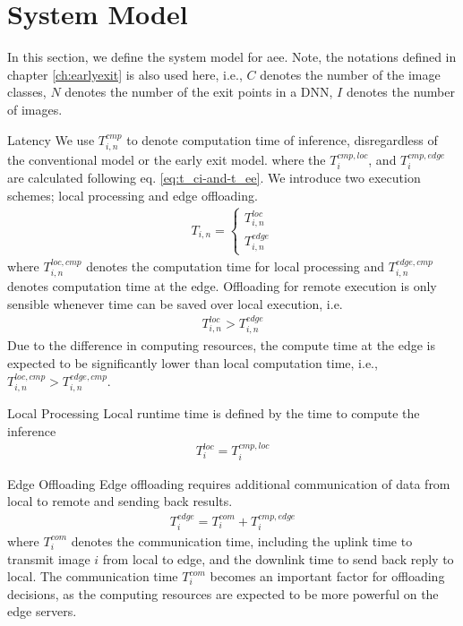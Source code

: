 \section{System Model} \label{sec:edge-system-model}
In this section, we define the system model for \gls{aee}. Note, the notations defined in chapter \ref{ch:earlyexit} is also used here, i.e., $ C $ denotes the number of the image classes, $ N $ denotes the number of the exit points in a DNN, $ I $ denotes the number of images. 	
\begin{enumdescript}
	\item[Latency]  We use $ T_{i,n}^{cmp} $ to denote computation time of inference, disregardless of the conventional model or the early exit model. 
	where the $ T_i^{cmp,loc} $, and $ T_i^{cmp,edge} $ are calculated following eq. \ref{eq:t_ci-and-t_ee}.
	We introduce two execution schemes; local processing and edge offloading.
	\begin{align}
	T_{i,n} = \begin{cases}
	T_{i,n}^{loc} \\
	T_{i,n}^{edge}
	\end{cases}
	\end{align}
	where $ T_{i,n}^{loc,cmp} $ denotes the computation time for local processing and $ T_{i,n}^{edge,cmp} $ denotes computation time at the edge. 
	Offloading for remote execution is only sensible whenever time can be saved over local execution, i.e.
	\begin{align*}
	T_{i,n}^{loc} > T_{i,n}^{edge}
	\end{align*}
	Due to the difference in computing resources, the compute time at the edge is expected to be significantly lower than local computation time, i.e., $ T_{i,n}^{loc,cmp} > T_{i,n}^{edge,cmp} $. 
	
	
	\begin{enumdescript}
		\item[Local Processing] Local runtime time is defined by the time to compute the inference
		\begin{align}
		T_{i}^{loc}= T_{i}^{cmp,loc}
		\end{align}
		\item[Edge Offloading] Edge offloading requires additional communication of data from local to remote and sending back results.
		\begin{align}
		T_{i}^{edge}=T_{i}^{com}+ T_{i}^{cmp,edge}
		\end{align}
		where $ T^{com}_i $ denotes the communication time, including the uplink time to transmit image $ i $ from local to edge, and the downlink time to send back reply to local. The communication time $ T^{com}_i $ becomes an important factor for offloading decisions, as the computing resources are expected to be more powerful on the edge servers.			
		

\end{enumdescript}
\end{enumdescript}
